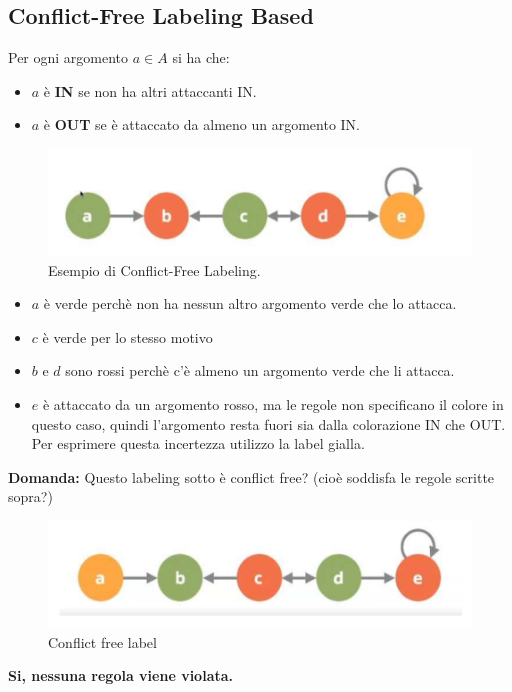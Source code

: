 \subsection{Conflict-Free Labeling Based}
Per ogni argomento $a \in A$ si ha che:
\begin{itemize}
    \item $a$ è \textbf{IN} se non ha altri attaccanti IN.
    \item $a$ è \textbf{OUT} se è attaccato da almeno un argomento IN.
\end{itemize}
\begin{figure}[htp]
	\centering
    \includegraphics[width=12cm, keepaspectratio]{img/Cap7/CF.png}
    \caption{Esempio di Conflict-Free Labeling.}
\end{figure}
\begin{itemize}
    \item $a$ è verde perchè non ha nessun altro argomento verde che lo attacca.
    \item $c$ è verde per lo stesso motivo
    \item $b$ e $d$ sono rossi perchè c’è almeno un argomento verde che li attacca.
    \item $e$ è attaccato da un argomento rosso, ma le regole non specificano il colore in questo caso, quindi l’argomento resta fuori sia dalla colorazione IN che OUT. Per esprimere questa incertezza utilizzo la label gialla.
\end{itemize}
\textbf{Domanda: } Questo labeling sotto è conflict free? (cioè soddisfa le regole scritte sopra?)
\begin{figure}[htp]
	\centering
    \includegraphics[width=12cm, keepaspectratio]{img/Cap7/CF2.png}
    \caption{Conflict free label}
\end{figure}
\begin{center}
    \textbf{Si, nessuna regola viene violata.}
\end{center}

